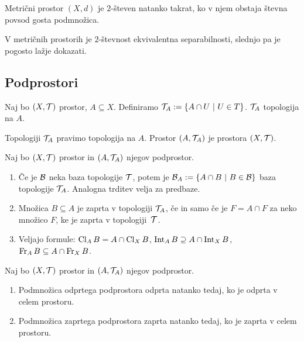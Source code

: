 \begin{izrek}
    Metrični prostor $(X, d)$ je $2$-števen natanko takrat, ko v njem obstaja števna povsod gosta podmnožica.
\end{izrek}

\begin{opomba}
    V metričnih prostorih je $2$-števnost ekvivalentna separabilnosti, slednjo pa je pogosto lažje dokazati.
\end{opomba}

\subsection{Podprostori}

Naj bo $(X, \mathcal{T})$ prostor, $A \subseteq X$. Definiramo $\mathcal{T}_A := \left\{A \cap U \ | \ U \in T\right\}$. $\mathcal{T}_A$ topologija na $A$.

\begin{definicija}
    Topologiji $\mathcal{T}_A$ pravimo  topologija na $A$.
    Prostor $(A, \mathcal{T}_A)$ je  prostora $(X, \mathcal{T})$.
\end{definicija}

\begin{trditev}
    Naj bo $(X, \mathcal{T})$ prostor in $(A, \mathcal{T}_A)$ njegov podprostor.
    \begin{enumerate}
        \item Če je $\mathcal{B}$ neka baza topologije $\mathcal{T}$, potem je $\mathcal{B}_A := \left\{A \cap B \ | \ B \in \mathcal{B}\right\}$ baza topologije $\mathcal{T}_A$. Analogna trditev velja za predbaze.
        \item Množica $B \subseteq A$ je zaprta v topologiji $\mathcal{T}_A$, če in samo če je $F = A \cap F$ za neko množico $F$, ke je zaprta v topologiji~$\mathcal{T}$.
        \item Veljajo formule: $\operatorname{Cl}_A B = A \cap \operatorname{Cl}_X B$, $\operatorname{Int}_A B \supseteq A \cap \operatorname{Int}_X B$, $\operatorname{Fr}_A B \subseteq A \cap \operatorname{Fr}_X B$.
    \end{enumerate}    
\end{trditev}

\begin{trditev}
    Naj bo $(X, \mathcal{T})$ prostor in $(A, \mathcal{T}_A)$ njegov podprostor.
    \begin{enumerate}
        \item Podmnožica odprtega podprostora odprta natanko tedaj, ko je odprta v celem prostoru.
        \item Podmnožica zaprtega podprostora zaprta natanko tedaj, ko je zaprta v celem prostoru.
    \end{enumerate}
\end{trditev}

